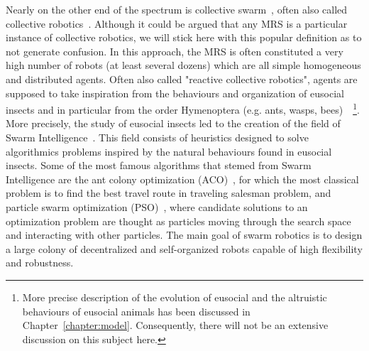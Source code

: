     Nearly on the other end of the spectrum is collective swarm~\cite{Bonabeau1999}, often also called collective robotics~\cite{Parker2008}. Although it could be argued that any MRS is a particular instance of collective robotics, we will stick here with this popular definition as to not generate confusion. In this approach, the MRS is often constituted a very high number of robots (at least several dozens) which are all simple homogeneous and distributed agents. Often also called "reactive collective robotics", agents are supposed to take inspiration from the behaviours and organization of eusocial insects and in particular from the order Hymenoptera (e.g. ants, wasps, bees)~\cite{Wilson1998}~\footnote{More precise description of the evolution of eusocial and the altruistic behaviours of eusocial animals has been discussed in Chapter~\ref{chapter:model}. Consequently, there will not be an extensive discussion on this subject here.}. More precisely, the study of eusocial insects led to the creation of the field of Swarm Intelligence~\cite{Zoghby2013}. This field consists of heuristics designed to solve algorithmics problems inspired by the natural behaviours found in eusocial insects. Some of the most famous algorithms that stemed from Swarm Intelligence are the ant colony optimization (ACO)~\cite{Dorigo2004a}, for which the most classical problem is to find the best travel route in traveling salesman problem, and particle swarm optimization (PSO)~\cite{Kennedy1995}, where candidate solutions to an optimization problem are thought as particles moving through the search space and interacting with other particles. The main goal of swarm robotics is to design a large colony of decentralized and self-organized robots capable of high flexibility and robustness.


